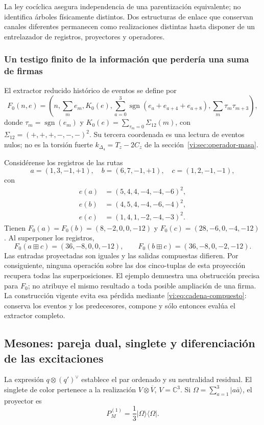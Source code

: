 La ley cocíclica asegura independencia de una parentización equivalente;
no identifica árboles físicamente distintos. Dos estructuras de enlace
que conservan canales diferentes permanecen como realizaciones distintas
hasta disponer de un entrelazador de registros, proyectores y operadores.

\subsubsection{Un testigo finito de la información que perdería una suma de firmas}

El extractor reducido histórico de eventos se define por
\[
 F_0(n,e)=\left(n,\sum_m e_m,K_0(e),
 \sum_{a=0}^3\operatorname{sgn}(e_a+e_{a+4}+e_{a+8}),
 \sum_m\tau_m\tau_{m+3}\right),
\]
donde \(\tau_m=\operatorname{sgn}(e_m)\) y
\(K_0(e)=\sum_{\tau_m=0}\Sigma_{12}(m)\), con
\(\Sigma_{12}=(+,+,+,-,-,-)^2\). Su tercera coordenada es una
lectura de eventos nulos; no es la torsión fuerte
\(k_{\Delta_4}=T_z-2C_z\) de la
sección~\ref{vi:sec:operador-masa}.

Considérense los registros de las rutas
\[
 a=(1,3,-1,+1),\quad b=(6,7,-1,+1),\quad c=(1,2,-1,-1),
\]
con
\begin{align*}
 e(a)&=(5,4,4,-4,-4,-6)^2,\\
 e(b)&=(4,5,4,-4,-6,-4)^2,\\
 e(c)&=(1,4,1,-2,-4,-3)^2.
\end{align*}
Tienen \(F_0(a)=F_0(b)=(8,-2,0,0,-12)\) y
\(F_0(c)=(28,-6,0,-4,-12)\). Al superponer los registros,
\[
 F_0(a\boxplus c)=(36,-8,0,0,-12),\qquad
 F_0(b\boxplus c)=(36,-8,0,-2,-12).
\]
Las entradas proyectadas son iguales y las salidas compuestas difieren.
Por consiguiente, ninguna operación sobre las dos cinco-tuplas de esta
proyección recupera todas las superposiciones. El ejemplo demuestra una
obstrucción precisa para \(F_0\); no atribuye el mismo resultado a toda
posible ampliación de una firma. La construcción vigente evita esa
pérdida mediante \eqref{vi:eq:cadena-compuesto}: conserva los eventos
y los predecesores, compone y sólo entonces evalúa el extractor completo.

\subsection{Mesones: pareja dual, singlete y diferenciación de las excitaciones}
\label{vi:subsec:mesones-familias}

La expresión \(q\otimes(q')^\vee\) establece el par ordenado y su
neutralidad residual. El singlete de color pertenece a la realización
\(V\otimes\overline V\), \(V=\mathbb C^3\). Si
\(\Omega=\sum_{a=1}^3|a\bar a\rangle\), el proyector es
\begin{equation}
 P_M^{(1)}=\frac13|\Omega\rangle\langle\Omega|.
 \label{vi:eq:singlete-meson}
\end{equation}

